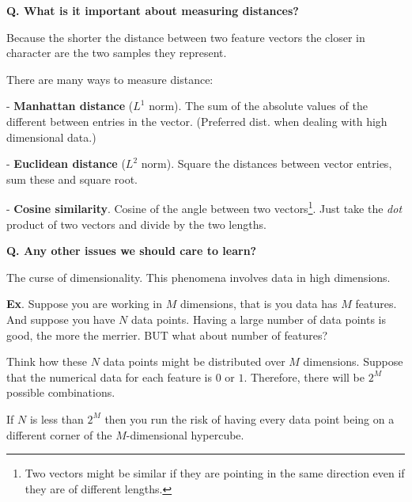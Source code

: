 \begin{frame}[fragile, label={distance}]{\textbf{Q. What is it important about measuring distances?}}
  \begin{wideitemize}
    \item Because the shorter the distance between two feature vectors the closer
    in character are the two samples they represent.
    \item There are many ways to measure distance:
    \begin{wideitemize}
      \item[-] \textbf{Manhattan distance} ($L^{1}$ norm). The sum of the absolute values of the different between
      entries in the vector. {\footnotesize (Preferred dist. when dealing with high dimensional data.)}
      \item[-] \textbf{Euclidean distance} ($L^{2}$ norm). Square the distances between vector entries,
      sum these and square root.
      \item[-] \textbf{Cosine similarity}. Cosine of the angle between two vectors\footnote{Two vectors
      might be similar if they are pointing in the same direction even if they are of different lengths.}.
      Just take the \textit{dot} product of two vectors and divide by the two lengths.
    \end{wideitemize}
  \end{wideitemize}
\end{frame}

\begin{frame}[fragile, label={CoD}]{\textbf{Q. Any other issues we should care to learn?}}
  \begin{wideitemize}
    \item The curse of dimensionality. This phenomena involves data in high dimensions.
    \item \textbf{Ex}. Suppose you are working in $M$ dimensions, that is you data has $M$
    features. And suppose you have $N$ data points. Having a large number of
    data points is good, the more the merrier. BUT what about number of features?
    \item Think how these $N$ data points might be distributed over $M$ dimensions.
    Suppose that the numerical data for each feature is $0$ or $1$. Therefore, there
    will be $2^{M}$ possible combinations.
   \item {\footnotesize If $N$ is less than $2^{M}$ then you run the risk of
      having every data point being on a different corner of the $M$-dimensional hypercube.}
  \end{wideitemize}
\end{frame}

